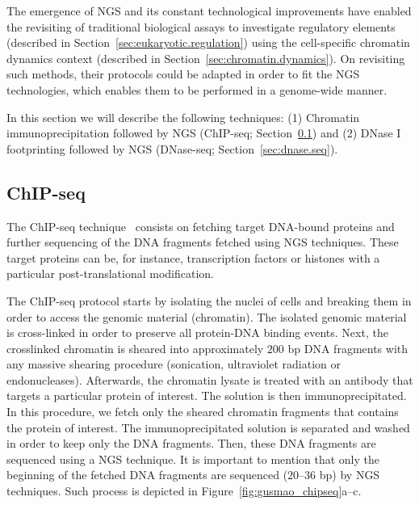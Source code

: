 The emergence of NGS and its constant technological improvements have enabled the revisiting of traditional biological assays to investigate regulatory elements (described in Section~\ref{sec:eukaryotic.regulation}) using the cell-specific chromatin dynamics context (described in Section~\ref{sec:chromatin.dynamics}). On revisiting such methods, their protocols could be adapted in order to fit the NGS technologies, which enables them to be performed in a genome-wide manner.

In this section we will describe the following techniques: (1) Chromatin immunoprecipitation followed by NGS (ChIP-seq; Section~\ref{sec:chip.seq}) and (2) DNase I footprinting followed by NGS (DNase-seq; Section~\ref{sec:dnase.seq}).

\subsection{ChIP-seq}
\label{sec:chip.seq}

The ChIP-seq technique~\cite{johnson2007} consists on fetching target DNA-bound proteins and further sequencing of the DNA fragments fetched using NGS techniques. These target proteins can be, for instance, transcription factors or histones with a particular post-translational modification.

The ChIP-seq protocol starts by isolating the nuclei of cells and breaking them in order to access the genomic material (chromatin). The isolated genomic material is cross-linked in order to preserve all protein-DNA binding events. Next, the crosslinked chromatin is sheared into approximately $200$ bp DNA fragments with any massive shearing procedure (sonication, ultraviolet radiation or endonucleases). Afterwards, the chromatin lysate is treated with an antibody that targets a particular protein of interest. The solution is then immunoprecipitated. In this procedure, we fetch only the sheared chromatin fragments that contains the protein of interest. The immunoprecipitated solution is separated and washed in order to keep only the DNA fragments. Then, these DNA fragments are sequenced using a NGS technique. It is important to mention that only the beginning of the fetched DNA fragments are sequenced ($20$--$36$ bp) by NGS techniques. Such process is depicted in Figure~\ref{fig:gusmao_chipseq}a--c.

